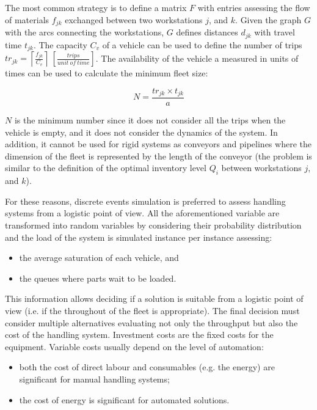 The most common strategy is to define a matrix $F$ with entries assessing the flow of materials $f_{jk}$ exchanged between two workstations $j$, and $k$. Given the graph $G$ with the arcs connecting the workstations, $G$ defines distances $d_{jk}$ with travel time $t_{jk}$. The capacity $C_v$ of a vehicle can be used to define the number of trips ${tr}_{jk}=\left\lceil\frac{f_{jk}}{C_v}\right\rceil\ \left[\frac{trips}{unit\ of\ time}\right]$. The availability of the vehicle a measured in units of times can be used to calculate the minimum fleet size:

\begin{equation}
    N=\frac{{tr}_{jk}\times t_{jk}}{a}
\end{equation}

$N$ is the minimum number since it does not consider all the trips when the vehicle is empty, and it does not consider the dynamics of the system. In addition, it cannot be used for rigid systems as conveyors and pipelines where the dimension of the fleet is represented by the length of the conveyor (the problem is similar to the definition of the optimal inventory level $Q_i$ between workstations $j$, and $k$).\par

For these reasons, discrete events simulation is preferred to assess handling systems from a logistic point of view. All the aforementioned variable are transformed into random variables by considering their probability distribution and the load of the system is simulated instance per instance assessing:

\begin{itemize}
    \item the average saturation of each vehicle, and 
    \item the queues where parts wait to be loaded.

\end{itemize}

This information allows deciding if a solution is suitable from a logistic point of view (i.e. if the throughout of the fleet is appropriate). The final decision must consider multiple alternatives evaluating not only the throughput but also the cost of the handling system. Investment costs are the fixed costs for the equipment. Variable costs usually depend on the level of automation:

\begin{itemize}
    \item both the cost of direct labour and consumables (e.g. the energy) are significant for manual handling systems;
    \item the cost of energy is significant for automated solutions.

\end{itemize}

